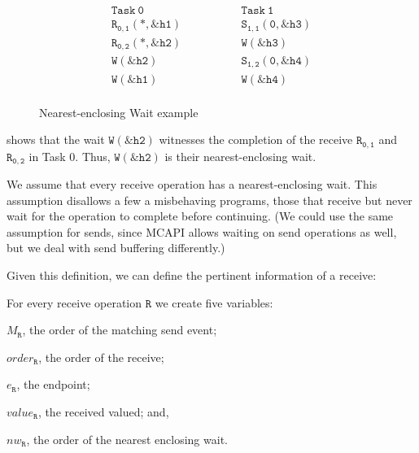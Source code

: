 \begin{figure}[h]
\[
\begin{array}{l|l}
\;\;\;\;\;\;\;\;\mathtt{Task\ 0}\;\;\;\;\;\;\;\; & \;\;\;\;\;\;\;\; \mathtt{Task\ 1}\;\;\;\;\;\;\;\; \\
\hline
\;\;\;\;\;\;\;\;\mathtt{R_{0,1}(*,\&h1)}\;\;\;\;\;\;\;\; & \;\;\;\;\;\;\;\; \mathtt{S_{1,1}(0,\&h3)}\;\;\;\;\;\;\;\; \\
\;\;\;\;\;\;\;\;\mathtt{R_{0,2}(*,\&h2)}\;\;\;\;\;\;\;\; & \;\;\;\;\;\;\;\; \mathtt{W{(\&h3)}}\;\;\;\;\;\;\;\; \\
\;\;\;\;\;\;\;\;\mathtt{W{(\&h2)}}\;\;\;\;\;\;\;\; & \;\;\;\;\;\;\;\; \mathtt{S_{1,2}(0,\&h4)}\;\;\;\;\;\;\;\; \\
\;\;\;\;\;\;\;\;\mathtt{W{(\&h1)}}\;\;\;\;\;\;\;\; & \;\;\;\;\;\;\;\; \mathtt{W{(\&h4)}}\;\;\;\;\;\;\;\; \\
\end{array}
\]
\caption{Nearest-enclosing Wait example} \label{fig:nw}
\end{figure}

 shows that the wait $\mathtt{W{(\&h2)}}$
witnesses the completion of the receive $\mathtt{R_{0,1}}$ and
$\mathtt{R_{0,2}}$ in Task 0. Thus, $\mathtt{W{(\&h2)}}$ is their
nearest-enclosing wait.

We assume that every receive operation has a nearest-enclosing
wait. This assumption disallows a few a misbehaving programs, those
that receive but never wait for the operation to complete before
continuing.  (We could use the same assumption for sends, since MCAPI
allows waiting on send operations as well, but we deal with send
buffering differently.)

Given this definition, we can define the pertinent information of a
receive:

\begin{definition}[Receive] \label{def:rcv}
For every receive operation $\mathtt{R}$ we create five variables:
\begin{compactenum}
\item $M_\mathtt{R}$, the order of the matching send event;

\item $\mathit{order}_\mathtt{R}$, the order of the receive;

\item $e_\mathtt{R}$, the endpoint;

\item $\mathit{value}_\mathtt{R}$, the received valued; and,

\item $\mathit{nw}_\mathtt{R}$, the order of the nearest enclosing wait.
\end{compactenum}
\end{definition}

